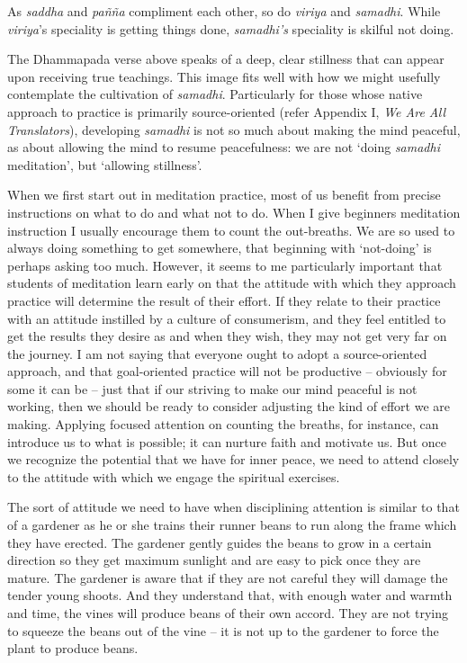 As \emph{saddha} and \emph{pañña} compliment each other, so do
\emph{viriya} and \emph{samadhi}. While \emph{viriya}'s speciality is
getting things done, \emph{samadhi's} speciality is skilful not doing.

The Dhammapada verse above speaks of a deep, clear stillness that can
appear upon receiving true teachings. This image fits well with how we
might usefully contemplate the cultivation of \emph{samadhi}.
Particularly for those whose native approach to practice is primarily
source-oriented (refer Appendix I, \emph{We Are All Translators}),
developing \emph{samadhi} is not so much about making the mind peaceful,
as about allowing the mind to resume peacefulness: we are not `doing
\emph{samadhi} meditation', but `allowing stillness'.

When we first start out in meditation practice, most of us benefit from
precise instructions on what to do and what not to do. When I give
beginners meditation instruction I usually encourage them to count the
out-breaths. We are so used to always doing something to get somewhere,
that beginning with `not-doing' is perhaps asking too much. However, it
seems to me particularly important that students of meditation learn
early on that the attitude with which they approach practice will
determine the result of their effort. If they relate to their practice
with an attitude instilled by a culture of consumerism, and they feel
entitled to get the results they desire as and when they wish, they may
not get very far on the journey. I am not saying that everyone ought to
adopt a source-oriented approach, and that goal-oriented practice will
not be productive -- obviously for some it can be -- just that if our
striving to make our mind peaceful is not working, then we should be
ready to consider adjusting the kind of effort we are making. Applying
focused attention on counting the breaths, for instance, can introduce
us to what is possible; it can nurture faith and motivate us. But once
we recognize the potential that we have for inner peace, we need to
attend closely to the attitude with which we engage the spiritual
exercises.

The sort of attitude we need to have when disciplining attention is
similar to that of a gardener as he or she trains their
runner beans\cite{beans} to run along the frame which they have erected. The
gardener gently guides the beans to grow in a certain direction so they
get maximum sunlight and are easy to pick once they are mature. The
gardener is aware that if they are not careful they will damage the
tender young shoots. And they understand that, with enough water and
warmth and time, the vines will produce beans of their own accord. They
are not trying to squeeze the beans out of the vine -- it is not up to
the gardener to force the plant to produce beans.

